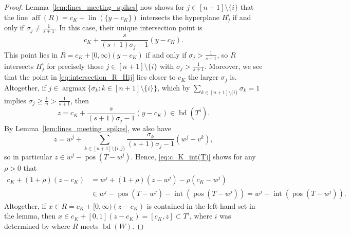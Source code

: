 \documentclass{amsart}
\DeclareMathOperator{\pos}{pos}
\DeclareMathOperator{\aff}{aff}
\DeclareMathOperator{\lin}{lin}
\DeclareMathOperator{\inte}{int}
\DeclareMathOperator{\bd}{bd}
\DeclareMathOperator{\argmax}{argmax}
\begin{document}
\begin{proof}
Lemma~\ref{lem:lines_meeting_spikes} now shows for $j \in [n+1] \setminus \{i\}$
that the line $\aff(R) = c_K + \lin(\{y-c_K\})$ intersects the hyperplane $H^i_j$ if and only if $\sigma_j \neq \frac{1}{s+1}$.
In this case, their unique intersection point is
\begin{equation}\label{eq:intersection_R_Hij}
	c_K + \frac{s}{(s+1) \sigma_j - 1} (y - c_K).
\end{equation}
This point lies in $R = c_K + [0,\infty) (y - c_K)$ if and only if $\sigma_j > \frac{1}{s+1}$,
so $R$ intersects $H^i_j$ for precisely those $j \in [n+1] \setminus \{i\}$ with $\sigma_j > \frac{1}{s+1}$.
Moreover, we see that the point in \eqref{eq:intersection_R_Hij} lies closer to $c_K$ the larger $\sigma_j$ is.
Altogether, if $j \in \argmax \{ \sigma_k : k \in [n+1] \setminus \{i\} \}$,
which by $\sum_{k \in [n+1] \setminus \{i\}} \sigma_k = 1$ implies $\sigma_j \geq \frac{1}{n} > \frac{1}{s+1}$,
then
\[
	z
	= c_K + \frac{s}{(s+1) \sigma_j - 1} (y - c_K)
	\in \bd(T^i).
\]
By Lemma~\ref{lem:lines_meeting_spikes}, we also have
\[
	z
	= w^j + \sum_{k \in [n+1] \setminus \{i,j\}} \frac{\sigma_k}{(s+1) \sigma_j - 1} (w^j - v^k),
\]
so in particular $z \in w^j - \pos(T - w^j)$.
Hence,
\eqref{eq:c_K_int(T)} shows for any $\rho > 0$ that
\begin{align*}
	c_K + (1+\rho) (z - c_K)
	& = w^j + (1 + \rho) (z - w^j) - \rho (c_K - w^j)
    \\
	& \in w^j - \pos(T - w^j) - \inte(\pos( T - w^j ))
	= w^j - \inte(\pos( T - w^j )).
\end{align*}
Altogether, if $x \in R = c_K + [0,\infty) (z - c_K)$ is contained in the left-hand set in the lemma,
then $x \in c_K + [0,1] (z - c_K) = [c_K,z] \subset T^i$,
where $i$ was determined by where $R$ meets $\bd(W)$.
\end{proof}
\end{document}
